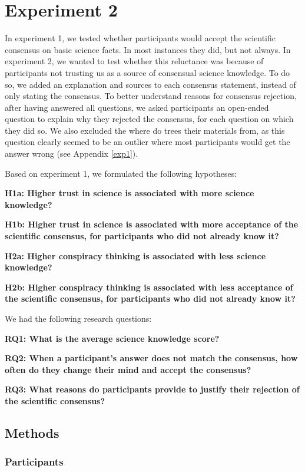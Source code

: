 \documentclass[
  doc,floatsintext]{apa6}
\begin{document}
\section{Experiment 2}\label{experiment-2}

In experiment 1, we tested whether participants would accept the scientific consensus on basic science facts. In most instances they did, but not always. In experiment 2, we wanted to test whether this reluctance was because of participants not trusting us as a source of consensual science knowledge. To do so, we added an explanation and sources to each consensus statement, instead of only stating the consensus. To better understand reasons for consensus rejection, after having answered all questions, we asked participants an open-ended question to explain why they rejected the consensus, for each question on which they did so. We also excluded the where do trees their materials from, as this question clearly seemed to be an outlier where most participants would get the answer wrong (see Appendix \ref{exp1}).

Based on experiment 1, we formulated the following hypotheses:

\textbf{H1a: Higher trust in science is associated with more science knowledge?}

\textbf{H1b: Higher trust in science is associated with more acceptance of the scientific consensus, for participants who did not already know it?}

\textbf{H2a: Higher conspiracy thinking is associated with less science knowledge?}

\textbf{H2b: Higher conspiracy thinking is associated with less acceptance of the scientific consensus, for participants who did not already know it?}

We had the following research questions:

\textbf{RQ1: What is the average science knowledge score?}

\textbf{RQ2: When a participant's answer does not match the consensus, how often do they change their mind and accept the consensus?}

\textbf{RQ3: What reasons do participants provide to justify their rejection of the scientific consensus?}

\subsection{Methods}\label{methods-1}

\subsubsection{Participants}\label{participants-1}
\end{document}
